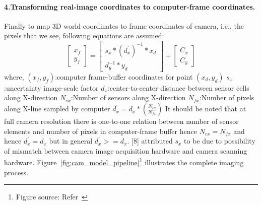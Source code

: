 \paragraph{4.Transforming real-image coordinates to computer-frame coordinates.}  
Finally to map 3D world-coordinates to frame coordinates of camera, i.e., the pixels that we see, following equations are assumed:  
\begin{equation}  
\begin{bmatrix}  
x_f \\  
y_f  
\end{bmatrix}  
=\begin{bmatrix}  
s_x*(d_x^{'})^{-1}*x_d\\  
d_y^{-1}*y_d  
\end{bmatrix}   
+\begin{bmatrix}  
C_x \\  
C_y  
\end{bmatrix}  
\end{equation}  
\noindent  
where,\newline  
$(x_f,y_f)$:computer frame-buffer coordinates for point $(x_d,y_d)$ \newline  
$s_x$:uncertainty image-scale factor \newline  
$d_x$:center-to-center distance between sensor cells along X-direction\newline  
$N_{cx}$:Number of sensors along X-direction\newline  
$N_{fx}$:Number of pixels along X-line sampled by computer\newline  
$d_x^{'}=d_x*\left(\frac{N_{cx}}{N_{fx}}\right)$\newline\newline  
It should be noted that at full camera resolution there is one-to-one relation between number of sensor elements and number of pixels in computer-frame buffer hence $N_{cx}=N_{fx}$ and hence $d_x^{'}=d_x$ but in general $d_x^{'}>=d_x$. [8] attributed $s_x$ to be due to  possibility of mismatch between camera image acquisition hardware and camera scanning hardware. Figure~\ref{fig:cam_model_pipeline}\footnote{Figure source: Refer~\cite{8}} illustrates the complete imaging process. 
